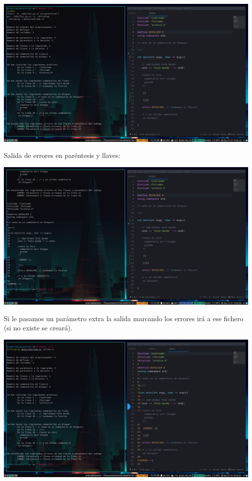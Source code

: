 \documentclass[12pt, spanish]{article}
\begin{document}
\begin{center}
	\includegraphics[scale=0.25]{prueba1.png}
\end{center}


Salida de errores en paréntesis y llaves: 

\begin{center}
	\includegraphics[scale=0.25]{prueba1-2.png}
\end{center}

\newpage

Si le pasamos un parámetro extra la salida marcando los errores irá a ese fichero (si no existe se creará).

\begin{center}
	\includegraphics[scale=0.25]{prueba2.png}
\end{center}
\end{document}
